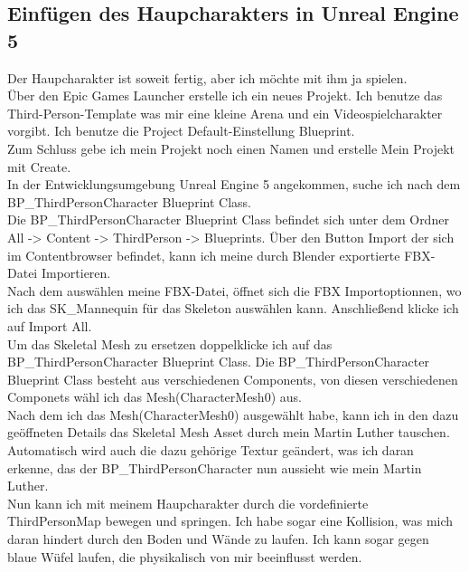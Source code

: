 \subsection{Einfügen des Haupcharakters in Unreal Engine 5}
Der Haupcharakter ist soweit fertig, aber ich möchte mit ihm ja spielen.
\\
Über den Epic Games Launcher erstelle ich ein neues Projekt. Ich benutze das Third-Person-Template was mir eine kleine Arena und ein Videospielcharakter vorgibt. Ich benutze die Project Default-Einstellung Blueprint.
\\
Zum Schluss gebe ich mein Projekt noch einen Namen und erstelle Mein Projekt mit Create.
\\
In der Entwicklungsumgebung Unreal Engine 5 angekommen, suche ich nach dem BP\_ThirdPersonCharacter Blueprint Class.
\\
Die BP\_ThirdPersonCharacter Blueprint Class befindet sich unter dem Ordner All -> Content -> ThirdPerson -> Blueprints. Über den Button Import der sich im Contentbrowser befindet, kann ich meine durch Blender exportierte FBX-Datei Importieren.
\\
Nach dem auswählen meine FBX-Datei, öffnet sich die FBX Importoptionnen, wo ich das SK\_Mannequin für das Skeleton auswählen kann. Anschließend klicke ich auf Import All.
\\
Um das Skeletal Mesh zu ersetzen doppelklicke ich auf das BP\_ThirdPersonCharacter Blueprint Class. Die BP\_ThirdPersonCharacter Blueprint Class besteht aus verschiedenen Components, von diesen verschiedenen Componets wähl ich das Mesh(CharacterMesh0) aus.
\\
Nach dem ich das Mesh(CharacterMesh0) ausgewählt habe, kann ich in den dazu geöffneten Details das Skeletal Mesh Asset durch mein Martin Luther tauschen.
\\
Automatisch wird auch die dazu gehörige Textur geändert, was ich daran erkenne, das der BP\_ThirdPersonCharacter nun aussieht wie mein Martin Luther.
\\
Nun kann ich mit meinem Haupcharakter durch die vordefinierte ThirdPersonMap bewegen und springen. Ich habe sogar eine Kollision, was mich daran hindert durch den Boden und Wände zu laufen. Ich kann sogar gegen blaue Wüfel laufen, die physikalisch von mir beeinflusst werden.
%
%
%
%
%
%
%
